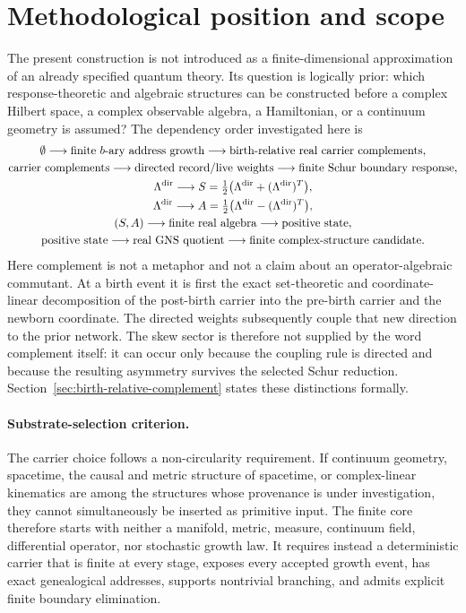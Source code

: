 \documentclass[11pt]{article}
\theoremstyle{remark}
\numberwithin{equation}{section}
\begin{document}
\section{Methodological position and scope}\label{sec:methodological-position}
The present construction is not introduced as a finite-dimensional approximation of an already specified quantum theory. Its question is logically prior: which response-theoretic and algebraic structures can be constructed before a complex Hilbert space, a complex observable algebra, a Hamiltonian, or a continuum geometry is assumed? The dependency order investigated here is
\begin{equation}
\begin{gathered}
  \emptyset
  \longrightarrow
  \text{finite }b\text{-ary address growth}
  \longrightarrow
  \text{birth-relative real carrier complements},\\
  \text{carrier complements}
  \longrightarrow
  \text{directed record/live weights}
  \longrightarrow
  \text{finite Schur boundary response},\\
  \Lambda^{\rm dir}
  \longrightarrow
  S=\tfrac12\bigl(\Lambda^{\rm dir}+(\Lambda^{\rm dir})^T\bigr),\\
  \Lambda^{\rm dir}
  \longrightarrow
  A=\tfrac12\bigl(\Lambda^{\rm dir}-(\Lambda^{\rm dir})^T\bigr),\\
  (S,A)
  \longrightarrow
  \text{finite real algebra}
  \longrightarrow
  \text{positive state},\\
  \text{positive state}
  \longrightarrow
  \text{real GNS quotient}
  \longrightarrow
  \text{finite complex-structure candidate}.
\end{gathered}
\label{eq:finite-provenance-chain}
\end{equation}
Here complement is not a metaphor and not a claim about an operator-algebraic commutant. At a birth event it is first the exact set-theoretic and coordinate-linear decomposition of the post-birth carrier into the pre-birth carrier and the newborn coordinate. The directed weights subsequently couple that new direction to the prior network. The skew sector is therefore not supplied by the word complement itself: it can occur only because the coupling rule is directed and because the resulting asymmetry survives the selected Schur reduction. Section~\ref{sec:birth-relative-complement} states these distinctions formally.

\paragraph{Substrate-selection criterion.}
The carrier choice follows a non-circularity requirement. If continuum geometry, spacetime, the causal and metric structure of spacetime, or complex-linear kinematics are among the structures whose provenance is under investigation, they cannot simultaneously be inserted as primitive input. The finite core therefore starts with neither a manifold, metric, measure, continuum field, differential operator, nor stochastic growth law. It requires instead a deterministic carrier that is finite at every stage, exposes every accepted growth event, has exact genealogical addresses, supports nontrivial branching, and admits explicit finite boundary elimination.
\end{document}
